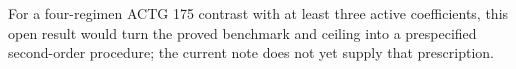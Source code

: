 For a four-regimen ACTG 175 contrast with at least three active coefficients, this open result would turn the proved benchmark and ceiling into a prespecified second-order procedure; the current note does not yet supply that prescription.